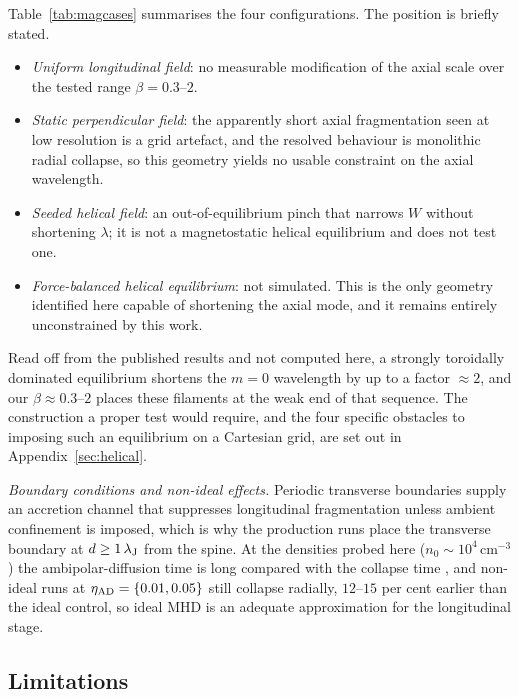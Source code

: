 \documentclass[usenatbib,twoside,twocolumn]{mnras}
\begin{document}
Table~\ref{tab:magcases} summarises the four configurations. The position is briefly stated.

\begin{itemize}\setlength{\itemsep}{1pt}
\item \emph{Uniform longitudinal field}: no measurable modification of the axial scale over the tested range $\beta=0.3$--$2$.
\item \emph{Static perpendicular field}: the apparently short axial fragmentation seen at low resolution is a grid artefact, and the resolved behaviour is monolithic radial collapse, so this geometry yields no usable constraint on the axial wavelength.
\item \emph{Seeded helical field}: an out-of-equilibrium pinch that narrows $W$ without shortening $\lambda$; it is not a magnetostatic helical equilibrium and does not test one.
\item \emph{Force-balanced helical equilibrium}: not simulated. This is the only geometry identified here capable of shortening the axial mode, and it remains entirely unconstrained by this work.
\end{itemize}

Read off from the published \citet{Fiege2000} results and not computed here, a strongly toroidally dominated equilibrium shortens the $m=0$ wavelength by up to a factor $\approx2$, and our $\beta\approx0.3$--$2$ places these filaments at the weak end of that sequence. The construction a proper test would require, and the four specific obstacles to imposing such an equilibrium on a Cartesian grid, are set out in Appendix~\ref{sec:helical}.

\emph{Boundary conditions and non-ideal effects.} Periodic transverse boundaries supply an accretion channel that suppresses longitudinal fragmentation unless ambient confinement is imposed, which is why the production runs place the transverse boundary at $d\geq1\,\lambda_{\rm J}$ from the spine. At the densities probed here ($n_0\sim10^4$\,cm$^{-3}$) the ambipolar-diffusion time is long compared with the collapse time \citep{Tassis2004}, and non-ideal runs at $\eta_{\rm AD}=\{0.01,0.05\}$ still collapse radially, $12$--$15$ per cent earlier than the ideal control, so ideal MHD is an adequate approximation for the longitudinal stage.



\subsection{Limitations}
\label{sec:limitations}
\end{document}
